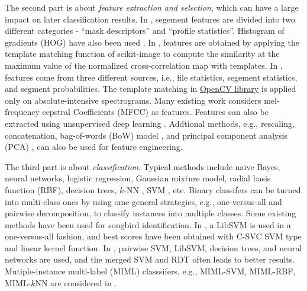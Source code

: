 \documentclass[12pt,peerreview,letterpaper]{IEEEtran}
\begin{document}
The second part is about {\em feature extraction and selection}, which can have a large impact on later classification results. In \cite{mlsp1}, segement features are divided into two different categories - ``mask descriptors'' and ``profile statistics''. Histogram of gradients (HOG) have also been used \cite{mlsp1}. In \cite{fodor2013ninth}, features are obtained by applying the template matching function of scikit-image to compute the similarity at the maximum value of the normalized cross-correlation map with templates. In \cite{Lasseck13}, features come from three different sources, i.e., file statistics, segement statistics, and segment probabilities. The template matching in \href{http://opencv.org}{OpenCV library} is applied only on absolute-intensive spectrograms. Many existing work \cite{Stowell_NIPSW13,dufour2013clusterized,chennovel13,Massaron13} considers mel-frequency cepstral Coefficients (MFCC)%
as features.  Features can also be extracted using unsupervised deep learning \cite{mencialearning2013}. Addtional methods, e.g., rescaling\cite{mlsp1}, concatenation\cite{dufour2013clusterized}, bag-of-words (BoW) model \cite{Li_CVPR05}, and principal component analysis (PCA) \cite{jolliffe2005principal}, can also be used for feature engineering.

The third part is about {\em classification}. Typical methods include naive Bayes, neural networks, logistic regression, Gaussian mixture model, radial basis function (RBF), decision trees, $k$-NN \cite{cover1967nearest}, SVM \cite{cortes1995support}, etc. Binary classifers can be turned into multi-class ones by using ome general strategies, e.g., one-versus-all and pairwise decomposition, to classify instances into multiple classes.
Some existing methods have been used for songbird identification. In \cite{dufour2013clusterized}, a LibSVM is used in a one-versus-all fashion, and best scores have been obtained with C-SVC SVM type and linear kernel function. In \cite{mencialearning2013}, pairwise SVM, LibSVM, decision trees, and neural networks are used, and the merged SVM and RDT often leads to better results. Mutiple-instance multi-label (MIML) classsifers, e.g., MIML-SVM, MIML-RBF, MIML-$k$NN are considered in \cite{mlsp1}.
\end{document}
